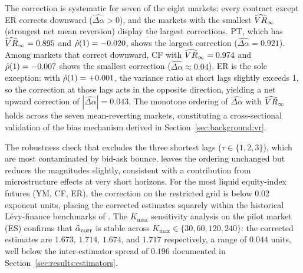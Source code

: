 \documentclass[12pt,a4paper]{article}
\begin{document}
The correction is systematic for seven of the eight markets: every contract
except ER corrects downward ($\widehat{\Delta\alpha}>0$), and the markets with
the smallest $\widehat{VR}_\infty$ (strongest net mean reversion) display the largest
corrections.
PT, which has $\widehat{VR}_\infty = 0.895$ and $\hat{\rho}(1) = -0.020$, shows the
largest correction ($\widehat{\Delta\alpha}=0.921$).
Among markets that correct downward, CF with $\widehat{VR}_\infty = 0.974$ and
$\hat{\rho}(1) = -0.007$ shows the smallest correction ($\widehat{\Delta\alpha}\approx
0.04$).
ER is the sole exception: with $\hat{\rho}(1) = +0.001$, the variance ratio at
short lags slightly exceeds 1, so the correction at those lags acts in the
opposite direction, yielding a net upward correction of
$|\widehat{\Delta\alpha}| = 0.043$.
The monotone ordering of $\widehat{\Delta\alpha}$ with $\widehat{VR}_\infty$ holds
across the seven mean-reverting markets, constituting a cross-sectional
validation of the bias mechanism derived in
Section~\ref{sec:background:vr}.

The robustness check that excludes the three shortest lags ($\tau\in\{1,2,3\}$),
which are most contaminated by bid-ask bounce, leaves the ordering unchanged
but reduces the magnitudes slightly, consistent with a contribution from
microstructure effects at very short horizons.
For the most liquid equity-index futures (YM, CF, ER), the correction on the
restricted grid is below 0.02 exponent units, placing the corrected estimates
squarely within the historical Lévy-finance benchmarks of \cite{MantegnaStanley1994,Gopikrishnan1999}.
The $K_{\max}$ sensitivity analysis on the pilot market (ES) confirms that
$\hat{\alpha}_{\mathrm{corr}}$ is stable across $K_{\max}\in\{30,60,120,240\}$:
the corrected estimates are $1.673$, $1.714$, $1.674$, and $1.717$ respectively,
a range of $0.044$ units, well below the inter-estimator spread of $0.196$
documented in Section~\ref{sec:results:estimators}.
\end{document}
